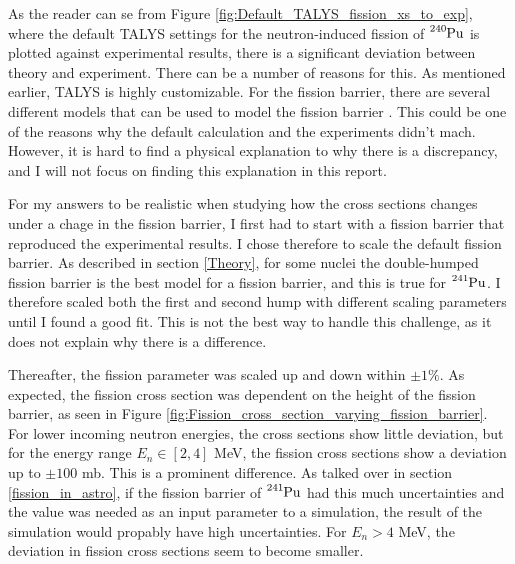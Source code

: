 \documentclass[]{article}
\begin{document}
As the reader can se from Figure \ref{fig:Default_TALYS_fission_xs_to_exp}, where the default TALYS settings for the neutron-induced fission of $\ce{^{240}Pu}$ is plotted against experimental results, there is a significant deviation between theory and experiment. There can be a number of reasons for this. As mentioned earlier, TALYS is highly customizable. For the fission barrier, there are several different models that can be used to model the fission barrier \cite{TALYSmanual}. This could be one of the reasons why the default calculation and the experiments didn't mach. However, it is hard to find a physical explanation to why there is a discrepancy, and I will not focus on finding this explanation in this report. 

\par 
\vspace{3mm}

 \noindent For my answers to be realistic when studying how the cross sections changes under a chage in the fission barrier, I first had to start with a fission barrier that reproduced the experimental results. I chose therefore to scale the default fission barrier. As described in section \ref{Theory}, for some nuclei the double-humped fission barrier is the best model for a fission barrier, and this is true for $\ce{^{241}Pu}$. I therefore scaled both the first and second hump with different scaling parameters until I found a good fit. This is not the best way to handle this challenge, as it does not explain why there is a difference.
 
 \par 
 \vspace{3mm}
 \noindent Thereafter, the fission parameter was scaled up and down within $\pm 1 \%$. As expected, the fission cross section was dependent on the height of the fission barrier, as seen in Figure \ref{fig:Fission_cross_section_varying_fission_barrier}. For lower incoming neutron energies, the cross sections show little deviation, but for the energy range $E_n \in [2,4]$ MeV, the fission cross sections show a deviation up to $\pm 100$ mb. This is a prominent difference. As talked over in section \ref{fission_in_astro}, if the fission barrier of $\ce{^{241}Pu}$ had this much uncertainties and the value was needed as an input parameter to a simulation, the result of the simulation would propably have high uncertainties. For $E_n > 4$ MeV, the deviation in fission cross sections seem to become smaller.
 
\end{document}
